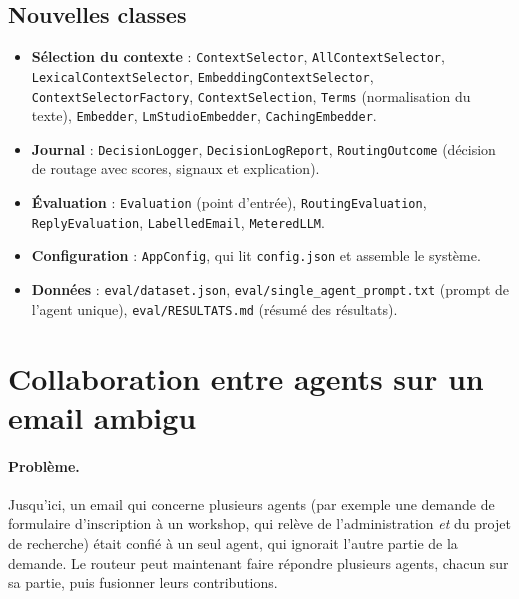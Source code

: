 \documentclass[11pt,a4paper]{article}
\newcommand{\code}[1]{\texttt{#1}}
\begin{document}
\subsection{Nouvelles classes}

\begingroup\raggedright
\begin{itemize}
  \item \textbf{Sélection du contexte} : \code{ContextSelector}, \code{AllContextSelector},
        \code{LexicalContextSelector}, \code{EmbeddingContextSelector},
        \code{ContextSelectorFactory}, \code{ContextSelection}, \code{Terms}
        (normalisation du texte), \code{Embedder}, \code{LmStudioEmbedder},
        \code{CachingEmbedder}.
  \item \textbf{Journal} : \code{DecisionLogger}, \code{DecisionLogReport},
        \code{RoutingOutcome} (décision de routage avec scores, signaux et explication).
  \item \textbf{Évaluation} : \code{Evaluation} (point d'entrée), \code{RoutingEvaluation},
        \code{ReplyEvaluation}, \code{LabelledEmail}, \code{MeteredLLM}.
  \item \textbf{Configuration} : \code{AppConfig}, qui lit \code{config.json} et assemble
        le système.
  \item \textbf{Données} : \code{eval/dataset.json}, \code{eval/single\_agent\_prompt.txt}
        (prompt de l'agent unique), \code{eval/RESULTATS.md} (résumé des résultats).
\end{itemize}
\par\endgroup

\section{Collaboration entre agents sur un email ambigu}
\label{sec:collab}

\paragraph{Problème.} Jusqu'ici, un email qui concerne plusieurs agents (par exemple une
demande de formulaire d'inscription à un workshop, qui relève de l'administration
\emph{et} du projet de recherche) était confié à un seul agent, qui ignorait l'autre
partie de la demande. Le routeur peut maintenant faire répondre plusieurs agents, chacun
sur sa partie, puis fusionner leurs contributions.
\end{document}
